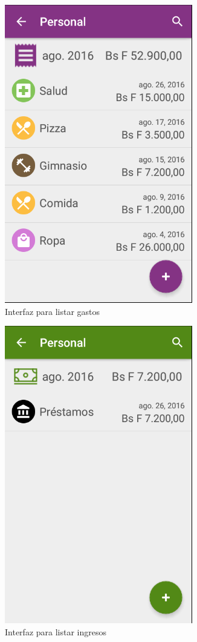 \begin{figure}[ht]
  \centering
  \includegraphics[scale=0.45,type=png,ext=.png,read=.png]{imagenes/expenses_list}
 \caption{Interfaz para listar gastos}
  \label{fig:interfazListarGastos}
\end{figure}
\begin{figure}[ht]
  \centering
  \includegraphics[scale=0.45,type=png,ext=.png,read=.png]{imagenes/incomes_list}
  \caption{Interfaz para listar ingresos}
  \label{fig:interfazListarIngresos}
\end{figure}

